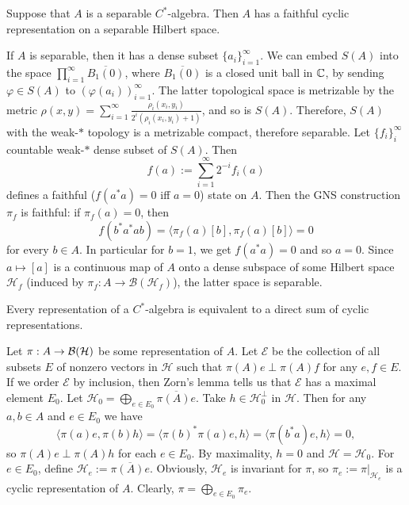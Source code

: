 \begin{proposition}
  Suppose that $A$ is a separable $C^*$-algebra. Then $A$ has a faithful
  cyclic representation on a separable Hilbert space.
\end{proposition}

\begin{myproof}
  If $A$ is separable, then it has a dense subset $\{a_i\}_{i = 1} ^\infty$.
  We can embed $S(A)$ into the space $\prod_{i = 1} ^\infty \overline{B_1 (0)}$, where $\overline{B_1 (0)}$
  is a closed unit ball in $\mathbb {C}$, by sending $\varphi\in S(A)$ to $(\varphi(a_i))_{i = 1} ^\infty$. The latter topological space is metrizable by
  the metric $\rho (x, y) = \sum_{i = 1} ^\infty \frac{\rho_i (x_i, y_i)}{2^i (\rho_i (x_i, y_i) + 1)}$,
  and so is $S(A)$. Therefore, $S(A)$ with the weak-$*$ topology is a metrizable compact, therefore separable.
  Let $\{f_i\}_i ^{\infty}$
  countable weak-$*$ dense subset of $S(A)$. Then 
  $$f(a) := \sum_{i = 1} ^{\infty} 2^{-i} f_i (a)$$
  defines a faithful ($f(a^* a) = 0$ iff $a = 0$) state on $A$.
  Then the GNS construction $\pi_f$ is faithful: if $\pi_f (a) = 0$, then 
  $$f(b^* a^* a b) = \langle \pi_f (a) [b], \pi_f (a) [b] \rangle = 0$$
  for every $b \in A$. In particular for $b = 1$, we get $f(a^* a) = 0$ and so $a = 0$.
  Since $a \mapsto [a]$ is 
a continuous map of $A$ onto a dense subspace of some Hilbert space $\mathcal{H}_f$ (induced by $\pi_f : A \to \mathcal{B}(\mathcal{H}_f)$), the latter space is
separable.
\end{myproof}

\begin{proposition}
  Every representation of a $C^*$-algebra is equivalent to a direct sum of cyclic representations.
\end{proposition}

\begin{myproof}
  Let $\pi: A \to \operatorname{\mathcal{B} (\mathcal{H})}$ be some representation of $A$.
  Let $\mathcal{E}$ be the collection of all subsets $E$ of nonzero vectors in $\mathcal{H}$
  such that $\pi(A) e \perp \pi(A)f$ for any $e, f \in E$. If we order $\mathcal{E}$ by inclusion, 
  then Zorn's lemma tells us that $\mathcal{E}$ has a maximal element $E_0$.
  Let $\mathcal{H}_0 = \bigoplus_{e \in E_0} \overline{\pi(A) e}$. Take $h \in \mathcal{H}_0 ^{\perp}$ in $\mathcal{H}$.
  Then for any $a, b \in A$ and $e \in E_0$ we have 
  $$\langle \pi(a) e, \pi(b) h \rangle = \langle \pi(b) ^* \pi (a) e, h \rangle = \langle \pi(b^* a) e, h\rangle = 0,$$
  so $\pi(A)e \perp \pi(A)h$ for each $e \in E_0$. By maximality, $h = 0$ and $\mathcal{H} = \mathcal{H}_0$.
  For $e \in E_0$, define $\mathcal{H}_e := \overline{\pi(A) e}$.
  Obviously, $\mathcal{H}_e$ is invariant for $\pi$, so $\pi_e := \pi\big|_{\mathcal{H}_e}$ is a cyclic representation of $A$.
  Clearly, $\pi = \bigoplus_{e\in E_0} \pi_e$.
\end{myproof}

